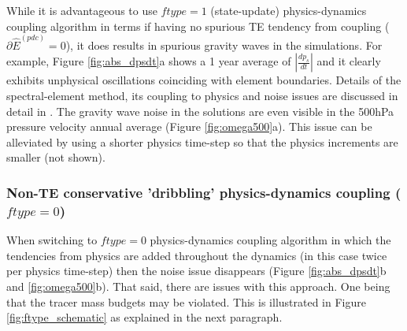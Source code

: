 \documentclass{agujournal}
\newcommand*{\gi}[1]{\widehat{#1}}
\begin{document}
While it is advantageous to use $ftype=1$ (state-update) physics-dynamics coupling algorithm in terms if having no spurious TE tendency from coupling ($\partial \gi{E}^{({pdc})}=0$), it does results in spurious gravity waves in the simulations. For example, Figure \ref{fig:abs_dpsdt}a shows a 1 year average of $|\frac{dp_s}{dt}|$ and it clearly exhibits unphysical oscillations coinciding with element boundaries. Details of the spectral-element method, its coupling to physics and noise issues are discussed in detail in \citet{HetAl2018MWR}. The gravity wave noise in the solutions are even visible in the 500hPa pressure velocity annual average (Figure \ref{fig:omega500}a). This issue can be alleviated by using a shorter physics time-step so that the physics increments are smaller (not shown). 

\subsubsection{Non-TE conservative 'dribbling' physics-dynamics coupling ($ftype=0$)}\label{se:pdc_problem}
When switching to $ftype=0$ physics-dynamics coupling algorithm in which the tendencies from physics are added throughout the dynamics (in this case twice per physics time-step) then the noise issue disappears (Figure \ref{fig:abs_dpsdt}b and \ref{fig:omega500}b). That said, there are issues with this approach. One being that the tracer mass budgets may be violated. This is illustrated in Figure \ref{fig:ftype_schematic} as explained in the next paragraph. 
\end{document}
